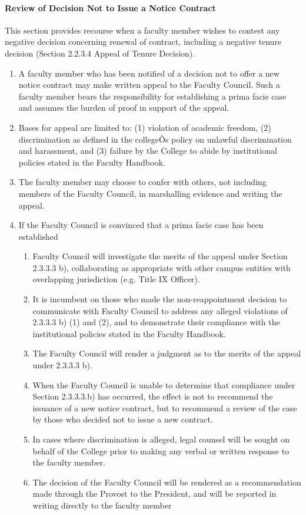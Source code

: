 \documentclass[letterpaper, 11pt]{article}
\begin{document}
			\paragraph{Review of Decision Not to Issue a Notice Contract}
				This section provides recourse when a faculty member wishes to contest any negative decision concerning renewal of contract, including a negative tenure decision (Section 2.2.3.4 Appeal of Tenure Decision).
				\begin{enumerate}[label=\alph*)]
					\item{A faculty member who has been notified of a decision not to offer a new notice contract may make written appeal to the Faculty Council.  Such a faculty member bears the responsibility for establishing a prima facie case and assumes the burden of proof in support of the appeal.}
					\item{Bases for appeal are limited to: (1) violation of academic freedom, (2) discrimination as defined in the collegeÕs policy on unlawful discrimination and harassment, and (3) failure by the College to abide by institutional policies stated in the Faculty Handbook.}
					\item{The faculty member may choose to confer with others, not including members of the Faculty Council, in marshalling evidence and writing the appeal.}
					\item{If the Faculty Council is convinced that a prima facie case has been established
						\begin{enumerate}[label=\arabic*)]
							\item{Faculty Council will investigate the merits of the appeal under Section 2.3.3.3 b), collaborating as appropriate with other campus entities with overlapping jurisdiction (e.g. Title IX Officer).}
							\item{It is incumbent on those who made the non-reappointment decision to communicate with Faculty Council to address any alleged violations of 2.3.3.3 b) (1) and (2), and to demonstrate their compliance with the institutional policies stated in the Faculty Handbook.}
							\item{The Faculty Council will render a judgment as to the merits of the appeal under 2.3.3.3 b).}
							\item{When the Faculty Council is unable to determine that compliance under Section 2.3.3.3.b) has occurred, the effect is not to recommend the issuance of a new notice contract, but to recommend a review of the case by those who decided not to issue a new contract.}
							\item{In cases where discrimination is alleged, legal counsel will be sought on behalf of the College prior to making any verbal or written response to the faculty member.}
							\item{The decision of the Faculty Council will be rendered as a recommendation made through the Provost to the President, and will be reported in writing directly to the faculty member}
						\end{enumerate}
					}
				\end{enumerate}
\end{document}
